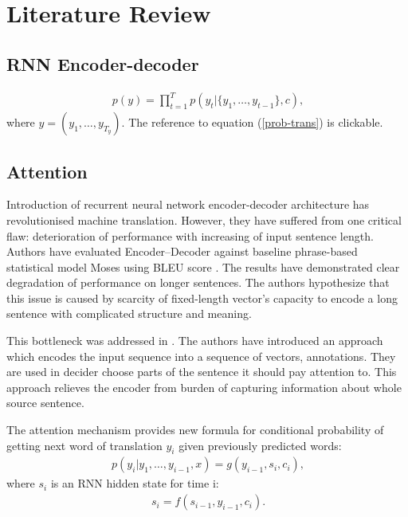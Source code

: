 \chapter{Literature Review}
\label{chap:lr}


\section{RNN Encoder-decoder}

\cite{B}

\begin{align}
\label{prob-trans}
\ p(y) = \prod_{t=1}^{T} p(y_t | \{y_1, \dots, y_{t-1}\}, c),
\end{align}
where $y = (y_1, \dots, y_{T_{y}})$. The reference to equation (\ref{prob-trans}) is clickable. 

\section{Attention}
Introduction of recurrent neural network encoder-decoder architecture has revolutionised machine translation. However, they have suffered from one critical flaw: deterioration of performance with increasing of input sentence length\cite{C}. Authors have evaluated Encoder–Decoder against baseline phrase-based statistical model Moses \cite{D} using BLEU score \cite{E}. The results have demonstrated clear degradation of performance on longer sentences. The authors hypothesize that this issue is caused by scarcity of fixed-length vector's capacity to encode a long sentence with complicated structure and meaning.

This bottleneck was addressed in \cite{A}. The authors have introduced an approach which encodes the input sequence into a sequence of vectors, annotations. They are used in decider choose parts of the sentence it should pay attention to. This approach relieves the encoder from burden of capturing information about whole source sentence.

The attention mechanism provides new formula for conditional probability of getting next word of translation $y_i$ given previously predicted words:
\begin{align}
\label{att-prob}
\ p(y_i| y_1, \dots, y_{i-1}, x) = g(y_{i-1}, s_i, c_i),
\end{align}
where $s_i$ is an RNN hidden state for time i:
\begin{align}
\ s_i = f(s_{i-1}, y_{i-1}, c_i).
\end{align}

